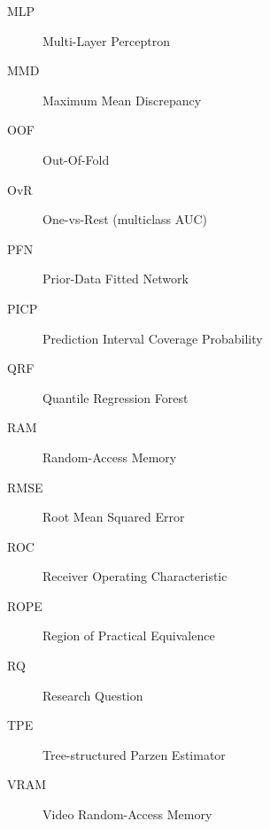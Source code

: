 \begin{description}
  \item[MLP] Multi-Layer Perceptron
  \item[MMD] Maximum Mean Discrepancy
  \item[OOF] Out-Of-Fold
  \item[OvR] One-vs-Rest (multiclass AUC)
  \item[PFN] Prior-Data Fitted Network
  \item[PICP] Prediction Interval Coverage Probability
  \item[QRF] Quantile Regression Forest
  \item[RAM] Random-Access Memory
  \item[RMSE] Root Mean Squared Error
  \item[ROC] Receiver Operating Characteristic
  \item[ROPE] Region of Practical Equivalence
  \item[RQ] Research Question
  \item[TPE] Tree-structured Parzen Estimator
  \item[VRAM] Video Random-Access Memory
\end{description}
\cleardoublepage
